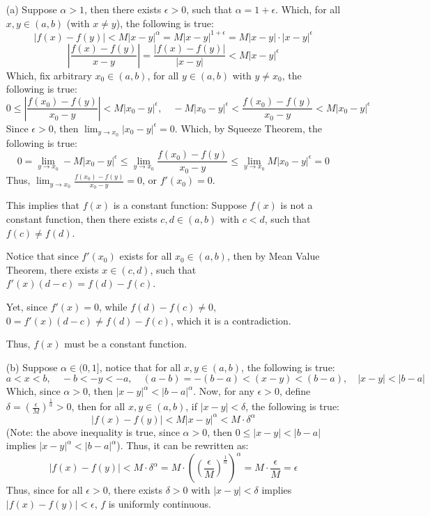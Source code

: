 \documentclass{article}
\begin{document}
\begin{itemize}
    \item[(a)] Suppose $\alpha>1$, then there exists $\epsilon>0$, such that $\alpha=1+\epsilon$. Which, for all $x,y\in (a,b)$ (with $x\neq y$), the following is true:
    $$|f(x)-f(y)|<M|x-y|^\alpha = M|x-y|^{1+\epsilon} = M|x-y|\cdot|x-y|^{\epsilon}$$
    $$\left|\frac{f(x)-f(y)}{x-y}\right| = \frac{|f(x)-f(y)|}{|x-y|}<M|x-y|^\epsilon$$
    Which, fix arbitrary $x_0\in (a,b)$, for all $y\in(a,b)$ with $y\neq x_0$, the following is true:
    $$0\leq \left|\frac{f(x_0)-f(y)}{x_0-y}\right|<M|x_0-y|^\epsilon,\quad -M|x_0-y|^\epsilon<\frac{f(x_0)-f(y)}{x_0-y}<M|x_0-y|^\epsilon$$
    Since $\epsilon>0$, then $\lim_{y\rightarrow x_0}|x_0-y|^\epsilon=0$. Which, by Squeeze Theorem, the following is true:
    $$0=\lim_{y\rightarrow x_0}-M|x_0-y|^\epsilon\leq \lim_{y\rightarrow x_0}\frac{f(x_0)-f(y)}{x_0-y} \leq \lim_{y\rightarrow x_0}M|x_0-y|^\epsilon = 0$$
    Thus, $\lim_{y\rightarrow x_0}\frac{f(x_0)-f(y)}{x_0-y}=0$, or $f'(x_0)=0$.

    \hfill

    This implies that $f(x)$ is a constant function: Suppose $f(x)$ is not a constant function, then there exists $c,d\in (a,b)$ with $c<d$, such that $f(c)\neq f(d)$.

    Notice that since $f'(x_0)$ exists for all $x_0\in(a,b)$, then by Mean Value Theorem, there exists $x\in (c,d)$, such that $f'(x)(d-c)=f(d)-f(c)$.

    Yet, since $f'(x)=0$, while $f(d)-f(c)\neq 0$, $0 = f'(x)(d-c)\neq f(d)-f(c)$, which it is a contradiction.

    Thus, $f(x)$ must be a constant function.

    \hfill
    
    \item[(b)] Suppose $\alpha\in (0,1]$, notice that for all $x,y\in(a,b)$, the following is true:
    $$a<x<b,\quad -b<-y<-a,\quad (a-b)=-(b-a)<(x-y)<(b-a),\quad |x-y|<|b-a|$$
    Which, since $\alpha>0$, then $|x-y|^\alpha<|b-a|^\alpha$. Now, for any $\epsilon>0$, define $\delta = (\frac{\epsilon}{M})^\frac{1}{\alpha}>0$, 
    then for all $x,y\in (a,b)$, if $|x-y|<\delta$, the following is true:
    $$|f(x)-f(y)|<M|x-y|^\alpha < M\cdot \delta^\alpha$$
    (Note: the above inequality is true, since $\alpha>0$, then $0\leq |x-y|<|b-a|$ implies $|x-y|^\alpha < |b-a|^\alpha$).
    Thus, it can be rewritten as:
    $$|f(x)-f(y)| < M\cdot \delta^\alpha = M\cdot \left(\left(\frac{\epsilon}{M}\right)^\frac{1}{\alpha}\right)^\alpha = M \cdot \frac{\epsilon}{M} = \epsilon$$
    Thus, since for all $\epsilon>0$, there exists $\delta>0$ with $|x-y|<\delta$ implies $|f(x)-f(y)|<\epsilon$, $f$ is uniformly continuous.


\end{itemize}
\end{document}
